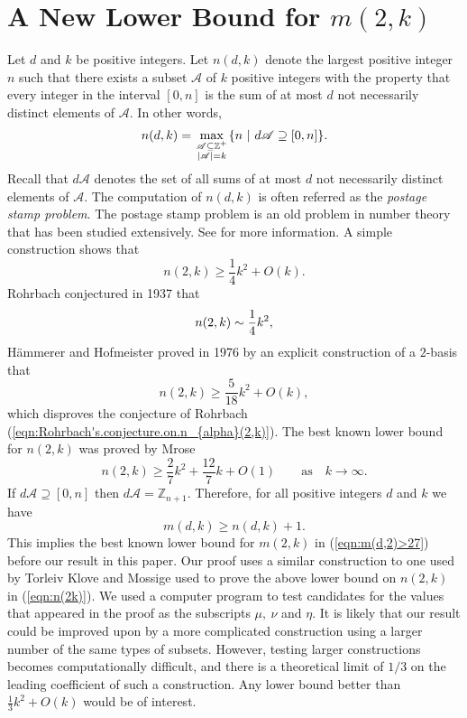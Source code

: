\documentclass[11pt]{article}
\theoremstyle{definition}
\def\Z{\mbox{$\mathbb Z$}}
\begin{document}
\section{A New Lower Bound for $m(2,k)$}
Let $d$ and $k$ be  positive integers. Let $n(d, k)$ denote the largest positive integer $n$ such that there exists a subset $\mathscr{A}$ of $k$ positive integers with the property that every integer in the interval $[0, n]$ is the sum of at most $d$ not necessarily distinct elements of $\mathscr{A}$. In other words, 
\[
n(d, k) = \max_{\scriptstyle \mathscr{A}\subseteq\mathbb Z^{+}\atop\scriptstyle |\mathscr{A}|=k}\{n\  |\ d \mathscr{A}\supseteq[0, n]\}.
\]
Recall that $d\mathscr A$ denotes the set of all sums of at most $d$ not necessarily distinct elements of $\mathscr A$. The computation of  $n(d, k)$ is often referred as the \emph{postage stamp problem}. The postage stamp problem is an old problem in number theory that has been studied extensively. See \cite{Hsu-Jia:CombinatorialNetworks,Selmer:1986a,Selmer:1986b} for more information. 
A simple construction shows that 
\[
n(2,k)\ge \frac14k^{2}+O(k).
\]
 Rohrbach \cite{Rohrbach:1937a} conjectured in 1937 that
\begin{equation}\label{eqn:Rohrbach's.conjecture.on.n_{alpha}(2,k)}
n(2,k)\sim\frac14{k^2},
\end{equation}
H\"ammerer and Hofmeister \cite{Hammerer-Hofmeister:1976} proved in
1976 by an explicit construction
of a $2$-basis that
\[
n(2,k)\ge \frac {5}{18}{k^2}+O(k),
\]
which disproves the conjecture of Rohrbach
(\ref{eqn:Rohrbach's.conjecture.on.n_{alpha}(2,k)}).
The  best known lower bound for $n(2,k)$ was proved by Mrose \cite{Mrose1979}
\begin{equation}\label{eqn:n(2k)}
n(2, k) \geq \frac{2}{7}k^2 + \frac{12}{7}k + O(1)\qquad  \text{as}\quad  k \to \infty.
\end{equation}
If  $d\mathscr{A}\supseteq[0, n]$ then  $d\mathscr{A}=\Z_{n+1}$. Therefore, for all positive integers $d$ and $k$ we have 
\[
m(d, k) \geq n(d, k)+1.
\]
This implies the best known lower bound for $m(2,k)$ in (\ref{eqn:m(d,2)>27}) before our result in this paper.
 Our proof uses a similar construction to one used by Torleiv Klove and Mossige used to prove the above lower bound on $n(2,k)$ in (\ref{eqn:n(2k)}).  We used a computer program to test candidates for the values that appeared in the proof as the subscripts $\mu,\ \nu$ and $\eta$.  It is likely that our result could be improved upon by a more complicated construction using a larger number of the same types of subsets.  However, testing larger constructions becomes computationally difficult, and there is a theoretical limit of $1/3$ on the leading coefficient of such a construction.  Any lower bound better than $\displaystyle\frac13k^2 + O(k)$ would be of interest.
\end{document}
